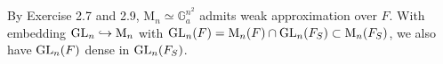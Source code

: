 \begin{problem}
By Exercise 2.7 and 2.9, $\mathrm{M}_{n} \simeq \mathbb{G}_{a}^{n^{2}}$ admits weak approximation over $F$.
With embedding $\operatorname{\mathrm{GL}}_{n} \hookrightarrow \mathrm{M}_{n}$ with $\operatorname{\mathrm{GL}}_{n}(F) = \mathrm{M}_{n}(F) \cap \operatorname{\mathrm{GL}}_{n}(F_S) \subset \mathrm{M}_{n}(F_{S})$,
we also have $\operatorname{\mathrm{GL}}_{n}(F)$ dense in $\operatorname{\mathrm{GL}}_{n}(F_S)$.
\end{problem}


\begin{problem} \notfinish
\end{problem}
\begin{problem} \notfinish
\end{problem}
\begin{problem} \notfinish
\end{problem}
\begin{problem} \notfinish
\end{problem}
\begin{problem} \notfinish
\end{problem}
\begin{problem} \notfinish
\end{problem}
\begin{problem} \notfinish
\end{problem}
\begin{problem} \notfinish
\end{problem}

